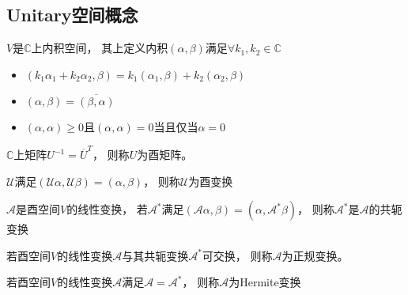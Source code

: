 \subsection{Unitary空间概念}

\begin{definition}[Unitary空间]
  $V$是$\mathbb{C}$上内积空间，
  其上定义内积$(\alpha,\beta)$满足$\forall k_1,k_2 \in \mathbb{C}$
  \begin{itemize}
  \item $(k_1 \alpha_1 + k_2 \alpha_2, \beta) = k_1(\alpha_1,\beta) + k_2(\alpha_2,\beta)$
  \item $(\alpha,\beta) = \overline{(\beta,\alpha)}$
  \item $(\alpha,\alpha) \geq 0$且$(\alpha,\alpha) = 0$当且仅当$\alpha = 0$
  \end{itemize}
\end{definition}

\begin{definition}[酉矩阵]
  $\mathbb{C}$上矩阵$U^{-1} = \overline{U}^T$，
  则称$U$为酉矩阵。
\end{definition}

\begin{definition}[酉变换]
  $\mathcal{U}$满足$(\mathcal{U}\alpha, \mathcal{U} \beta) = (\alpha,\beta)$，
  则称$\mathcal{U}$为酉变换
\end{definition}

\begin{definition}[共轭变换]
  $\mathcal{A}$是酉空间$V$的线性变换，
  若$\mathcal{A}^{*}$满足$(\mathcal{A}\alpha, \beta) = (\alpha, \mathcal{A}^{*}\beta)$，
  则称$\mathcal{A}^{*}$是$\mathcal{A}$的共轭变换
\end{definition}

\begin{definition}[正规变换]
  若酉空间$V$的线性变换$\mathcal{A}$与其共轭变换$\mathcal{A}^{*}$可交换，
  则称$\mathcal{A}$为正规变换。
\end{definition}

\begin{definition}[Hermite变换]
  若酉空间$V$的线性变换$\mathcal{A}$满足$\mathcal{A} = \mathcal{A}^{*}$，
  则称$\mathcal{A}$为Hermite变换
\end{definition}



